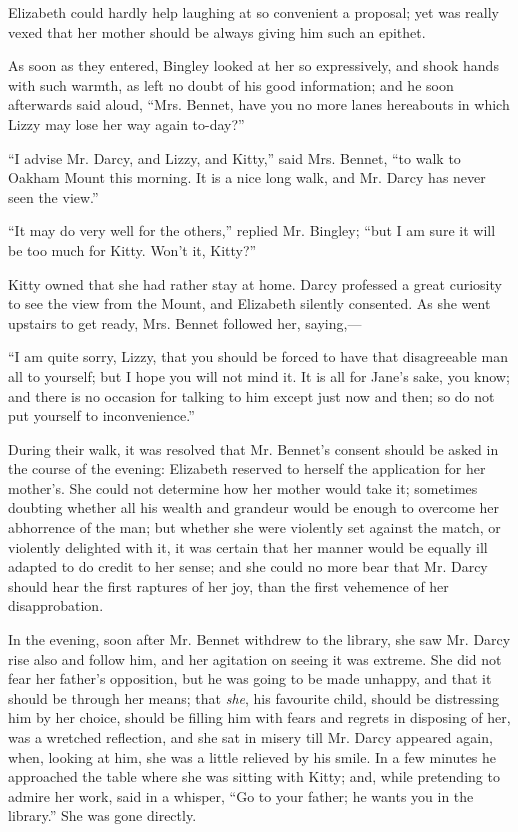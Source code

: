 \documentclass[12pt,openright]{book}
\begin{document}
Elizabeth could hardly help laughing at so convenient a proposal; yet was really vexed that her mother should be always giving him such an epithet.

As soon as they entered, Bingley looked at her so expressively, and shook hands with such warmth, as left no doubt of his good information; and he soon afterwards said aloud, “Mrs. Bennet, have you no more lanes hereabouts in which Lizzy may lose her way again to-day?”

“I advise Mr. Darcy, and Lizzy, and Kitty,” said Mrs. Bennet, “to walk to Oakham Mount this morning. It is a nice long walk, and Mr. Darcy has never seen the view.”

“It may do very well for the others,” replied Mr. Bingley; “but I am sure it will be too much for Kitty. Won’t it, Kitty?”

Kitty owned that she had rather stay at home. Darcy professed a great curiosity to see the view from the Mount, and Elizabeth silently consented. As she went upstairs to get ready, Mrs. Bennet followed her, saying,—

“I am quite sorry, Lizzy, that you should be forced to have that disagreeable man all to yourself; but I hope you will not mind it. It is all for Jane’s sake, you know; and there is no occasion for talking to him except just now and then; so do not put yourself to inconvenience.”

During their walk, it was resolved that Mr. Bennet’s consent should be asked in the course of the evening: Elizabeth reserved to herself the application for her mother’s. She could not determine how her mother would take it; sometimes doubting whether all his wealth and grandeur would be enough to overcome her abhorrence of the man; but whether she were violently set against the match, or violently delighted with it, it was certain that her manner would be equally ill adapted to do credit to her sense; and she could no more bear that Mr. Darcy should hear the first raptures of her joy, than the first vehemence of her disapprobation.

In the evening, soon after Mr. Bennet withdrew to the library, she saw Mr. Darcy rise also and follow him, and her agitation on seeing it was extreme. She did not fear her father’s opposition, but he was going to be made unhappy, and that it should be through her means; that \textit{she}, his favourite child, should be distressing him by her choice, should be filling him with fears and regrets in disposing of her, was a wretched reflection, and she sat in misery till Mr. Darcy appeared again, when, looking at him, she was a little relieved by his smile. In a few minutes he approached the table where she was sitting with Kitty; and, while pretending to admire her work, said in a whisper, “Go to your father; he wants you in the library.” She was gone directly.
\end{document}
